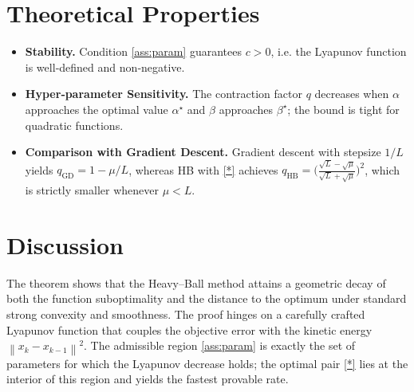 \documentclass{article}
\newcommand{\norm}[1]{\left\lVert #1\right\rVert}
\begin{document}
\section*{Theoretical Properties}
\begin{itemize}
\item \textbf{Stability.} Condition \ref{ass:param} guarantees $c>0$, i.e. the Lyapunov function is well‑defined and non‑negative.
\item \textbf{Hyper‑parameter Sensitivity.} The contraction factor $q$ decreases when $\alpha$ approaches the optimal value $\alpha^{\star}$ and $\beta$ approaches $\beta^{\star}$; the bound is tight for quadratic functions.
\item \textbf{Comparison with Gradient Descent.} Gradient descent with stepsize $1/L$ yields $q_{\text{GD}}=1-\mu/L$, whereas HB with \eqref{*} achieves $q_{\text{HB}}=\bigl(\frac{\sqrt{L}-\sqrt{\mu}}{\sqrt{L}+\sqrt{\mu}}\bigr)^{2}$, which is strictly smaller whenever $\mu<L$.
\end{itemize}

\section*{Discussion}
The theorem shows that the Heavy–Ball method attains a geometric decay of both the function suboptimality and the distance to the optimum under standard strong convexity and smoothness. The proof hinges on a carefully crafted Lyapunov function that couples the objective error with the kinetic energy $\norm{x_{k}-x_{k-1}}^{2}$. The admissible region \ref{ass:param} is exactly the set of parameters for which the Lyapunov decrease holds; the optimal pair \eqref{*} lies at the interior of this region and yields the fastest provable rate.

\newpage
\end{document}
